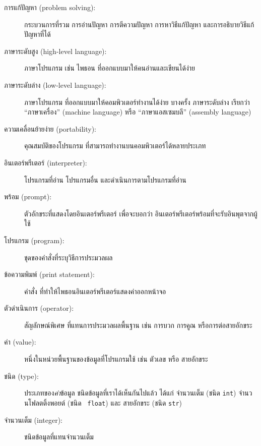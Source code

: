 \begin{description}

\item[การแก้ปัญหา (problem solving):] 
กระบวนการที่รวม การอ่านปัญหา การตีความปัญหา การหาวิธีแก้ปัญหา และการอธิบายวิธีแก้ปัญหาที่ได้

\item[ภาษาระดับสูง (high-level language):]  
ภาษาโปรแกรม เช่น ไพธอน ที่ออกแบบมาให้คนอ่านและเขียนได้ง่าย

\item[ภาษาระดับล่าง (low-level language):]  
ภาษาโปรแกรม
ที่ออกแบบมาให้คอมพิวเตอร์ทำงานได้ง่าย
บางครั้ง ภาษาระดับล่าง เรียกว่า ``ภาษาเครื่อง'' (machine language) หรือ
``ภาษาแอสเซมบลี'' (assembly language)

\item[ความเคลื่อนย้ายง่าย (portability):]  
คุณสมบัติของโปรแกรม ที่สามารถทำงานบนคอมพิวเตอร์ได้หลายประเภท

\item[อินเตอร์พรีเตอร์  (interpreter):]  
โปรแกรมที่อ่าน โปรแกรมอื่น และดำเนินการตามโปรแกรมที่อ่าน

\item[พร้อม (prompt):] 
ตัวอักขระที่แสดงโดยอินเตอร์พรีเตอร์ 
เพื่อจะบอกว่า อินเตอร์พรีเตอร์พร้อมที่จะรับอินพุตจากผู้ใช้

\item[โปรแกรม (program):] 
ชุดของคำสั่งที่ระบุวิธีการประมวลผล

\item[ข้อความพิมพ์ (print statement):]  
คำสั่ง ที่ทำให้ไพธอนอินเตอร์พรีเตอร์แสดงค่าออกหน้าจอ

\item[ตัวดำเนินการ (operator):]  
สัญลักษณ์พิเศษ ที่แทนการประมวลผลพื้นฐาน เช่น
การบวก การคูณ หรือการต่อสายอักขระ

\item[ค่า (value):]  
หนึ่งในหน่วยพื้นฐานของข้อมูลที่โปรแกรมใช้ เช่น ตัวเลข หรือ สายอักขระ

\item[ชนิด (type):] ประเภทของ\textit{ค่า}ข้อมูล  
ชนิดข้อมูลที่เราได้เห็นกันไปแล้ว ได้แก่ จำนวนเต็ม (ชนิด \texttt{int})
จำนวนโฟลตติ้งพอยต์ (ชนิด \texttt{
float})
และ สายอักขระ (ชนิด \texttt{str})

\item[จำนวนเต็ม (integer):] ชนิดข้อมูลที่แทนจำนวนเต็ม


\end{description}
